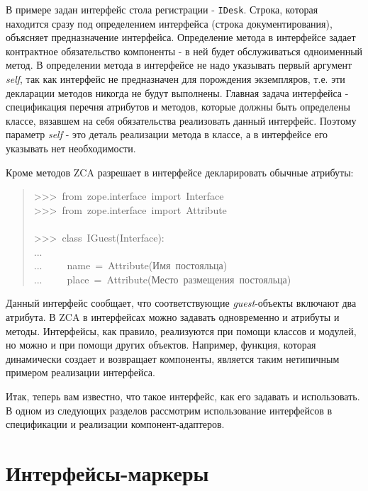 \documentclass[a4paper,openany,twoside,final]{book}
\providecommand*{\DUroletitlereference}[1]{\textsl{#1}}
\begin{document}
В примере задан интерфейс стола регистрации - \texttt{IDesk}.  Строка,
которая находится сразу под определением интерфейса (строка
документирования), объясняет предназначение интерфейса.  Определение
метода в интерфейсе задает контрактное обязательство компоненты - в
ней будет обслуживаться одноименный метод.  В определении метода в
интерфейсе не надо указывать первый аргумент \DUroletitlereference{self}, так как интерфейс
не предназначен для порождения экземпляров, т.е. эти декларации
методов никогда не будут выполнены.  Главная задача интерфейса -
спецификация перечня атрибутов и методов, которые должны быть
определены классе, вязавшем на себя обязательства реализовать данный
интерфейс.  Поэтому параметр \DUroletitlereference{self} - это деталь реализации метода в
классе, а в интерфейсе его указывать нет необходимости.

Кроме методов ZCA разрешает в интерфейсе декларировать обычные
атрибуты:

\begin{quote}{\ttfamily \raggedright \noindent
>{}>{}>~from~zope.interface~import~Interface\\
>{}>{}>~from~zope.interface~import~Attribute\\
~\\
>{}>{}>~class~IGuest(Interface):\\
...\\
...~~~~~name~=~Attribute(\textquotedbl{}Имя~постояльца\textquotedbl{})\\
...~~~~~place~=~Attribute(\textquotedbl{}Место~размещения~постояльца\textquotedbl{})
}
\end{quote}

Данный интерфейс сообщает, что соответствующие \DUroletitlereference{guest}-объекты
включают два атрибута.  В ZCA в интерфейсах можно задавать
одновременно и атрибуты и методы.  Интерфейсы, как правило,
реализуются при помощи классов и модулей, но можно и при помощи других
объектов.  Например, функция, которая динамически создает и возвращает
компоненты, является таким нетипичным примером реализации интерфейса.

Итак, теперь вам известно, что такое интерфейс, как его задавать и
использовать.  В одном из следующих разделов рассмотрим использование
интерфейсов в спецификации и реализации компонент-адаптеров.


\section{Интерфейсы-маркеры%
  \label{id31}%
}
\end{document}
